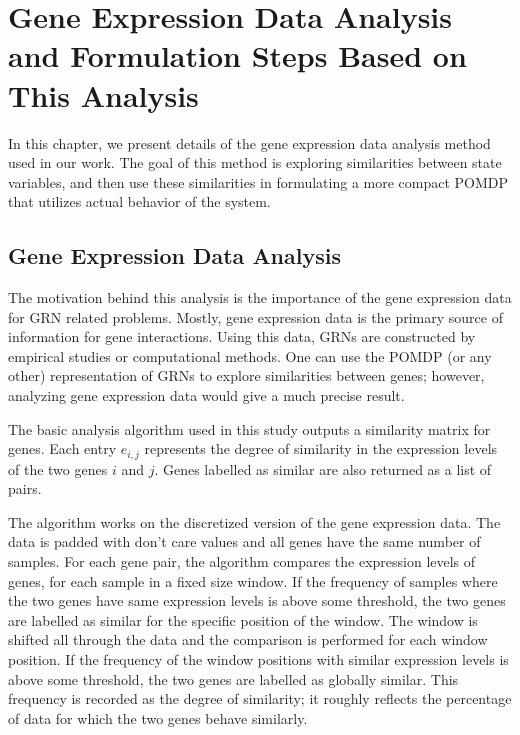 \chapter{Gene Expression Data Analysis and Formulation Steps Based on This Analysis}
\label{chapter:dataanalysis}

In this chapter, we present details of the gene expression data analysis method used in our work. The goal of
this method is exploring similarities between state variables, and then use these similarities in formulating
a more compact POMDP that utilizes actual behavior of the system.

\section{Gene Expression Data Analysis}
\label{section:dataanalysis}

The motivation behind this analysis is the importance of the gene expression data for GRN related problems.
Mostly, gene expression data is the primary source of information for gene interactions. Using this data,
GRNs are constructed by empirical studies or computational methods. One can use the POMDP (or any other)
representation of GRNs to explore similarities between genes; however, analyzing gene expression data would
give a much precise result.

The basic analysis algorithm used in this study outputs a similarity matrix for genes. Each entry $e_{i,j}$
represents the degree of similarity in the expression levels of the two genes $i$ and $j$. Genes labelled as
similar are also returned as a list of pairs.

The algorithm works on the discretized version of the gene expression data. The data is padded with don't
care values and all genes have the same number of samples. For each gene pair, the algorithm compares the
expression levels of genes, for each sample in a fixed size window. If the frequency of samples where the two
genes have same expression levels is above some threshold, the two genes are labelled as similar for the
specific position of the window. The window is shifted all through the data and the comparison is performed
for each window position. If the frequency of the window positions with similar expression levels is above
some threshold, the two genes are labelled as globally similar. This frequency is recorded as the degree of
similarity; it roughly reflects the percentage of data for which the two genes behave similarly.

